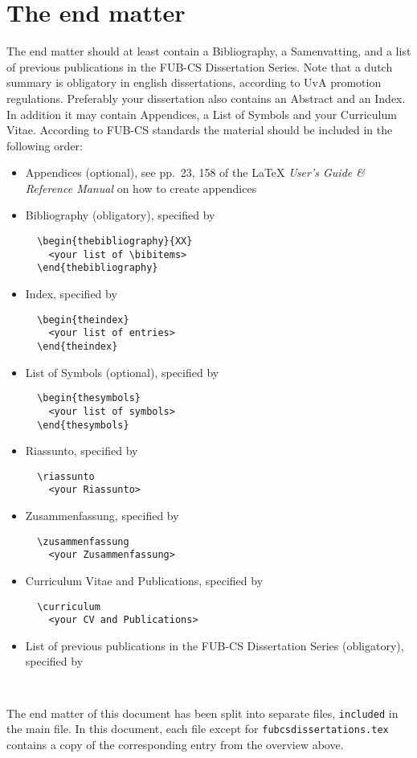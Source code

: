 \section{The end matter}
The end matter should at least contain a Bibliography, a Samenvatting,
and a list of previous publications in the FUB-CS Dissertation Series.
Note that a dutch summary is obligatory in english dissertations,
according to UvA promotion regulations.
Preferably your dissertation also contains an Abstract and an Index.
In addition it may contain
Appendices, a List of Symbols and your Curriculum Vitae. According to FUB-CS
standards the material should be included in the following order:
\begin{itemize}
\item
Appendices (optional), see pp.\ 23, 158 of the
  \LaTeX{} {\em User's Guide \& Reference Manual\/} on how to create
  appendices 
\item
Bibliography (obligatory), specified by 
\begin{verbatim}
  \begin{thebibliography}{XX}
    <your list of \bibitems>
  \end{thebibliography}
\end{verbatim}
\item
Index, specified by
\begin{verbatim}
  \begin{theindex}
    <your list of entries>
  \end{theindex}
\end{verbatim}
\item
List of Symbols (optional), specified by
\begin{verbatim}
  \begin{thesymbols}
    <your list of symbols>
  \end{thesymbols}
\end{verbatim}
\item
Riassunto, specified by
\begin{verbatim}
  \riassunto
    <your Riassunto>
\end{verbatim}
\item
Zusammenfassung, specified by
\begin{verbatim}
  \zusammenfassung
    <your Zusammenfassung>
\end{verbatim}

\item
Curriculum Vitae and Publications, specified by
\begin{verbatim}
  \curriculum
    <your CV and Publications>
\end{verbatim}
\item
List of previous publications in the FUB-CS Dissertation Series (obligatory), 
specified by
\begin{verbatim}
  
\end{verbatim}
\end{itemize}
The end matter of this document has been split into separate files,
\verb|included| in the main file.
In this document, each file except for {\tt fubcsdissertations.tex} 
contains a copy of the corresponding entry from the overview above.

